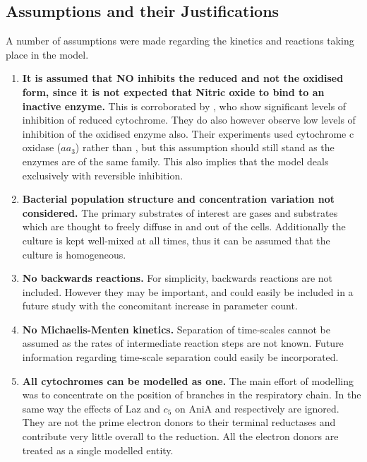 \subsection{Assumptions and their Justifications}
A number of assumptions were made regarding the kinetics and reactions taking place in the model.
\begin{enumerate}
 \item {\bf It is assumed that NO inhibits the reduced \cbbthree{} and not the oxidised form, since it is not expected that Nitric oxide to bind to an inactive enzyme.} This is corroborated by \citet{Giuffre2000}, who show significant levels of inhibition of reduced cytochrome. They do also however observe low levels of inhibition of the oxidised enzyme also. Their experiments used cytochrome c oxidase ($aa_3$) rather than \cbbthree{}, but this assumption should still stand as the enzymes are of the same family. This also implies that the model deals exclusively with reversible inhibition.
 \item {\bf Bacterial population structure and concentration variation not considered.} The primary substrates of interest are gases and substrates which are thought to freely diffuse in and out of the cells. Additionally the culture is kept well-mixed at all times, thus it can be assumed that the culture is homogeneous.
 \item {\bf No backwards reactions.} For simplicity, backwards reactions are not included. However they may be important, and could easily be included in a future study with the concomitant increase in parameter count.
 \item {\bf No Michaelis-Menten kinetics.} Separation of time-scales cannot be assumed as the rates of intermediate reaction steps are not known. Future information regarding time-scale separation could easily be incorporated.
 \item {\bf All cytochromes can be modelled as one.} The main effort of modelling was to concentrate on the position of branches in the respiratory chain. In the same way the effects of Laz and $c_5$ on AniA and \cbbthree{} respectively are ignored. They are not the prime electron donors to their terminal reductases and contribute very little overall to the reduction\cite{Deeudom2007}. All the electron donors are treated as a single modelled entity.
\end{enumerate}


